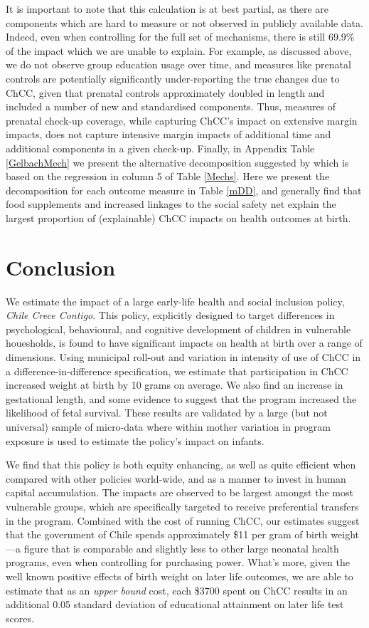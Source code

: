 \documentclass[12pt]{article}
\begin{document}
\begin{spacing}{1.4}
It is important to note that this calculation is at best partial, as
there are components which are hard to measure or not observed in
publicly available data.  Indeed, even when controlling for the full
set of mechanisms, there is still 69.9\% of the impact which we are
unable to explain.  For example, as discussed above, we do not
observe group education usage over time, and measures like prenatal
controls are potentially significantly under-reporting the true changes
due to ChCC, given that prenatal controls approximately doubled in
length and included a number of new and standardised components.
Thus, measures of prenatal check-up coverage, while capturing ChCC's
impact on extensive margin impacts, does not capture intensive margin
impacts of additional time and additional components in a given check-up.
Finally, in Appendix Table \ref{GelbachMech} we present the alternative
decomposition suggested by \citet{Gelbach2016} which is based on the
regression in column 5 of Table \ref{Mechs}.  Here we present the
decomposition for each outcome measure in Table \ref{mDD}, and generally
find that food supplements and increased linkages to the social safety
net explain the largest proportion of (explainable) ChCC impacts on
health outcomes at birth.

\section{Conclusion}
We estimate the impact of a large early-life health and social inclusion
policy, \emph{Chile Crece Contigo}.  This policy, explicitly designed to
target differences in psychological, behavioural, and cognitive
development of children in vulnerable houesholds, is found to have
significant impacts on health at birth over a range of dimensions.  Using
municipal roll-out and variation in intensity of use of ChCC in a
difference-in-difference specification, we estimate that participation in
ChCC increased weight at birth by 10 grams on average.  We also find an
increase in gestational length, and some evidence to suggest that the
program increased the likelihood of fetal survival.  These results are
validated by a large (but not universal) sample of micro-data where within
mother variation in program exposure is used to estimate the policy's impact
on infants.

We find that this policy is both equity enhancing, as well as quite
efficient when compared with other policies world-wide, and as a manner
to invest in human capital accumulation.  The impacts are observed to
be largest amongst the most vulnerable groups, which are specifically
targeted to receive preferential transfers in the program. Combined with
the cost of running ChCC, our estimates suggest that the government of
Chile spends approximately \$11 per gram of birth weight---a figure that
is comparable and slightly less to other large neonatal health programs,
even when controlling for purchasing power.  What's more, given the well
known positive effects of birth weight on later life outcomes, we are able
to estimate that as an \emph{upper bound} cost, each \$3700 spent on ChCC
results in an additional 0.05 standard deviation of educational attainment
on later life test scores.


\end{spacing}
\end{document}
